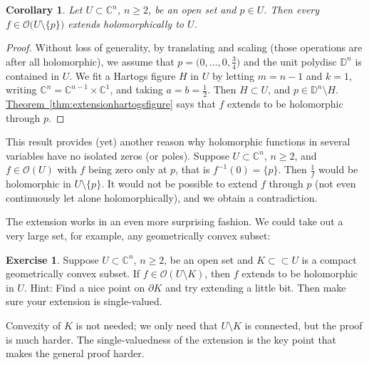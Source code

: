\documentclass[12pt,openany]{book}
\newcommand{\C}{{\mathbb{C}}}
\newcommand{\D}{{\mathbb{D}}}
\newcommand{\sO}{{\mathscr{O}}}
\theoremstyle{plain}
\newtheorem{cor}[thm]{Corollary}
\theoremstyle{remark}
\theoremstyle{definition}
\newenvironment{exbox}{%
    \def\FrameCommand{\vrule width 1pt \relax\hspace{10pt}}%
    \MakeFramed{\advance\hsize-\width\FrameRestore}%
}{%
    \endMakeFramed
}
\theoremstyle{exercise}
\newtheorem{exercise}{Exercise}[section]
\theoremstyle{example}
\newcommand{\thmref}[1]{\hyperref[#1]{Theorem~\ref*{#1}}}
\begin{document}
\begin{cor}
Let $U \subset \C^n$, $n \geq 2$, be an open set and $p \in U$.
Then every $f \in \sO\bigl(U \setminus \{ p \} \bigr)$
extends holomorphically to $U$.
\end{cor}

\begin{proof}
Without loss of generality,
by translating and scaling (those operations are after all holomorphic),
we assume that $p = \bigl(0,\ldots,0,\frac{3}{4}\bigr)$
and the unit polydisc $\D^n$ is contained in $U$.  We fit a Hartogs figure $H$
in $U$
by letting $m=n-1$ and $k=1$, writing $\C^n = \C^{n-1} \times \C^{1}$,
and taking $a = b = \frac{1}{2}$.
Then $H \subset U$, and $p \in \D^n \setminus H$.
\thmref{thm:extensionhartogsfigure} says that
$f$ extends to be holomorphic through $p$.
\end{proof}

This result provides (yet) another reason why holomorphic functions in several
variables have no isolated zeros (or poles).  Suppose $U \subset \C^n$,
$n \geq 2$, and $f \in \sO(U)$ with $f$ being zero only at $p$, that
is $f^{-1}(0) = \{ p \}$.  Then $\frac{1}{f}$ would be holomorphic in
$U \setminus \{ p \}$.  It would not be possible to extend $f$
through $p$ (not even continuously let alone holomorphically),
and we obtain a contradiction.

The extension works in an even more surprising fashion.  We could
take out a very large set, for example, any geometrically
convex subset:

\begin{exbox}
\begin{exercise} \label{exercise:convexhartogs}
Suppose $U \subset \C^n$, $n \geq 2$, be an open set and $K \subset \subset U$
is a compact geometrically
convex subset.
If $f \in \sO(U \setminus K)$,
then $f$ extends to be holomorphic in $U$.
Hint: Find a nice point on $\partial K$ and try extending a little bit.
Then make sure your extension is single-valued.
\end{exercise}
\end{exbox}

Convexity of $K$ is not needed; we only need that $U\setminus K$
is connected, but the proof is much harder.
The single-valuedness of the extension is the key point that makes the
general proof harder.
\end{document}
